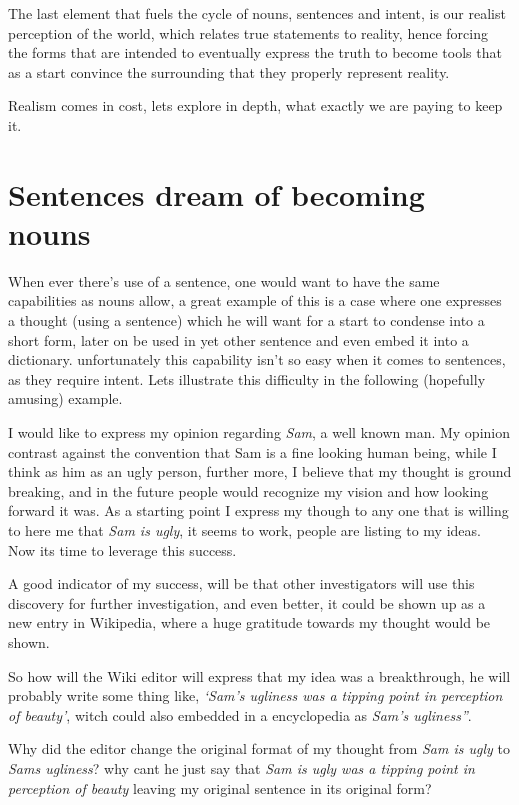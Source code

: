 \documentclass[10pt]{article}
\begin{document}
The last element that fuels the cycle of nouns, sentences and intent, is our realist perception of the world, which relates true statements to reality, hence forcing the forms that are intended to eventually express the truth to become tools that as a start convince the surrounding that they properly represent reality.\par
Realism comes in cost, lets explore in depth, what exactly we are paying to keep it.

\newpage 
\section*{Sentences dream of becoming nouns}

When ever there’s use of a sentence, one would want to have the same capabilities as nouns allow, a great example of this is a case where one expresses a thought (using a sentence) which he will  want  for a start to condense  into a short form, later on be used in yet other sentence and even  embed it into a dictionary. unfortunately this capability isn't so easy when it comes to sentences, as they require intent. Lets illustrate this difficulty in the following (hopefully amusing) example.\par
I would like to express my opinion regarding \textit{Sam}, a well known man. My opinion contrast against the  convention that Sam is a fine looking human being, while I think as him as an ugly person, further more, I believe that  my thought is ground breaking, and in the future people would recognize my vision and how looking forward it was. As a starting point I express my though to any one that is willing to here me that \textit{Sam is ugly}, it seems to work, people are listing to my ideas. Now its time to leverage this success.\par
A good indicator of my success, will be that  other investigators will use this discovery for further investigation, and even better, it could be shown up as a new entry in Wikipedia, where a huge gratitude towards my thought would be shown.\par
So how will the Wiki editor will express that my idea was a breakthrough, he will probably write some thing like, \textit{‘Sam’s ugliness was a tipping point in perception of beauty’}, witch could also embedded in a encyclopedia as \textit{Sam's ugliness”}.\par
Why did the editor change the original format of my thought from \textit{Sam is ugly} to \textit{Sams ugliness}? why cant he just say that \textit{Sam is ugly  was a tipping point in perception of beauty} leaving my original sentence in its original form? 
\end{document}
